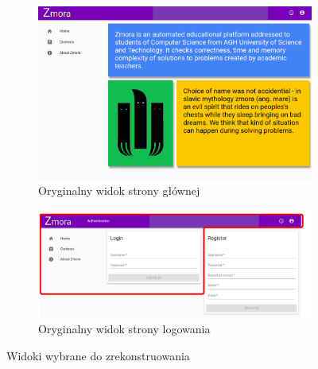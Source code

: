 \begin{figure}[h]
	\centering
	\begin{subfigure}{0.5\textwidth}
		\centering
		\includegraphics[width=0.9\linewidth]{images/homepage_zmora}
		\caption{Oryginalny widok strony głównej}
		\label{fig:homOrg}
	\end{subfigure}%
	\begin{subfigure}{0.5\textwidth}
		\centering
		\includegraphics[width=0.9\linewidth]{images/login_zmora}
		\caption{Oryginalny widok strony logowania}
		\label{fig:logOrg}
	\end{subfigure}
	\label{fig:orgView}
	\caption{Widoki wybrane do zrekonstruowania}
\end{figure}

